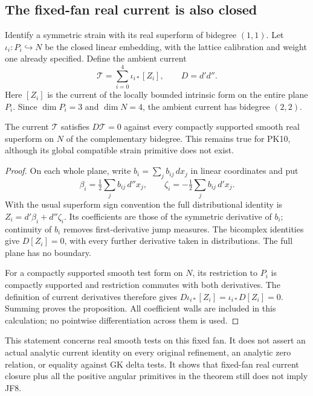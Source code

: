 \subsection{The fixed-fan real current is also closed}

Identify a symmetric strain with its real superform of bidegree
\((1,1)\).  Let \(\iota_i:P_i\hookrightarrow N\) be the
closed linear embedding, with the lattice calibration and weight
one already specified.  Define the ambient current
\[
                   \mathcal T=\sum_{i=0}^4\iota_{i*}[Z_i],
                      \qquad D=d'd''.
 \tag{PK12}
\]
Here \([Z_i]\) is the current of the locally bounded intrinsic
form on the entire plane \(P_i\).  Since \(\dim P_i=3\)
and \(\dim N=4\), the ambient current has bidegree \((2,2)\).

\begin{proposition}
\label{prop:r13-five-plane-coarse-current-closed}
The current \(\mathcal T\) satisfies \(D\mathcal T=0\)
against every compactly supported smooth real superform on
\(N\) of the complementary bidegree.  This remains true for
PK10, although its global compatible strain primitive does not
exist.
\end{proposition}

\begin{proof}
On each whole plane, write \(b_i=\sum_j b_{ij}\,dx_j\)
in linear coordinates and put
\[
 \beta_i=\tfrac12\sum_j b_{ij}\,d''x_j,
 \qquad
 \zeta_i=-\tfrac12\sum_j b_{ij}\,d'x_j.
\]
With the usual superform sign convention the full distributional
identity is
\(Z_i=d'\beta_i+d''\zeta_i\).  Its coefficients are those
of the symmetric derivative of \(b_i\); continuity of \(b_i\)
removes first-derivative jump measures.  The bicomplex identities
give \(D[Z_i]=0\), with every further derivative taken in
distributions.  The full plane has no boundary.

For a compactly supported smooth test form on \(N\), its
restriction to \(P_i\) is compactly supported and restriction
commutes with both derivatives.  The definition of current
derivatives therefore gives
\(D\iota_{i*}[Z_i]=\iota_{i*}D[Z_i]=0\).  Summing proves
the proposition.  All coefficient walls are included in this
calculation; no pointwise differentiation across them is used.
\end{proof}

This statement concerns real smooth tests on this fixed fan.
It does not assert an actual analytic current identity on every
original refinement, an analytic zero relation, or equality
against GK delta tests.  It shows that fixed-fan real current
closure plus all the positive angular primitives in the theorem
still does not imply JF8.

